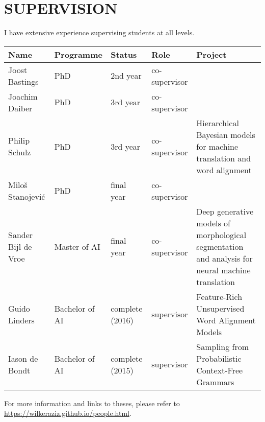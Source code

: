 \section*{SUPERVISION}

I have extensive experience supervising students at all levels. 

\begin{tabular}{l l l l p{6cm}}
\bf Name & \bf Programme & \bf Status & \bf Role & \bf Project \\ \hline
Joost Bastings & PhD & 2nd year & co-supervisor & \\
Joachim Daiber & PhD & 3rd year & co-supervisor & \\
Philip Schulz  & PhD & 3rd year & co-supervisor & Hierarchical Bayesian models for machine translation and word alignment \\
Milo\v{s} Stanojevi\'c & PhD & final year & co-supervisor & \\
Sander Bijl de Vroe & Master of AI & final year & co-supervisor & Deep generative models of morphological segmentation and analysis for neural machine translation\\
Guido Linders & Bachelor of AI & complete (2016) & supervisor & Feature-Rich Unsupervised Word Alignment Models \\
Iason de Bondt & Bachelor of AI & complete (2015) & supervisor & Sampling from Probabilistic Context-Free Grammars\\ \hline
\end{tabular}
For more information and links to theses, please refer to \url{https://wilkeraziz.github.io/people.html}.








